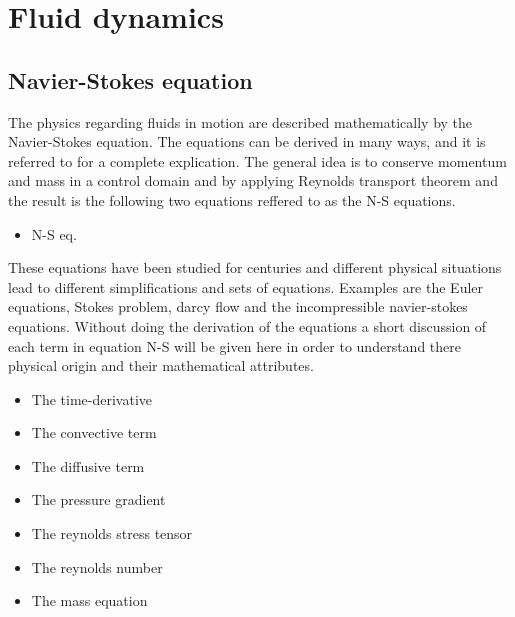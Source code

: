 
\chapter{Fluid dynamics} %

\label{physics} %


\section{Navier-Stokes equation}

The physics regarding fluids in motion are described mathematically by the Navier-Stokes equation. The equations can be derived in many ways, 
and it is referred to \cite{White} for a complete explication. The general idea is to conserve momentum and mass in a control domain and by 
applying Reynolds transport theorem and the result is the following two equations reffered to as the N-S equations. 
\begin{itemize}
\item N-S eq.
\end{itemize}
These equations have been studied for centuries and different physical situations lead to different simplifications and sets of equations. 
Examples are the Euler equations, Stokes problem, darcy flow and the incompressible navier-stokes equations. 
Without doing the derivation of the equations a short discussion of each term in equation N-S will be given here in order to understand there
physical origin and their mathematical attributes. 

\begin{itemize}
\item The time-derivative
\item The convective term 
\item The diffusive term 
\item The pressure gradient
\item The reynolds stress tensor
\item The reynolds number
\item The mass equation
\end{itemize}



